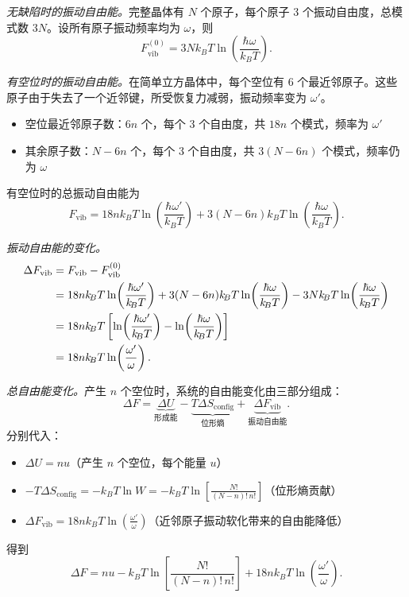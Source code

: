 \begin{derivationbox}[标准解题过程]
\textit{无缺陷时的振动自由能。}完整晶体有 $N$ 个原子，每个原子 3 个振动自由度，总模式数 $3N$。设所有原子振动频率均为 $\omega$，则
\begin{equation}
F_{\mathrm{vib}}^{(0)} = 3N k_{\!B}T\ln\!\left(\frac{\hbar\omega}{k_{\!B}T}\right).
\end{equation}

\textit{有空位时的振动自由能。}在简单立方晶体中，每个空位有 6 个最近邻原子。这些原子由于失去了一个近邻键，所受恢复力减弱，振动频率变为 $\omega'$。
\begin{itemize}
    \item 空位最近邻原子数：$6n$ 个，每个 3 个自由度，共 $18n$ 个模式，频率为 $\omega'$
    \item 其余原子数：$N-6n$ 个，每个 3 个自由度，共 $3(N-6n)$ 个模式，频率仍为 $\omega$
\end{itemize}
有空位时的总振动自由能为
\begin{equation}
F_{\mathrm{vib}} = 18n k_{\!B}T\ln\!\left(\frac{\hbar\omega'}{k_{\!B}T}\right) + 3(N-6n)k_{\!B}T\ln\!\left(\frac{\hbar\omega}{k_{\!B}T}\right).
\end{equation}

\textit{振动自由能的变化。}
\begin{align}
\Delta F_{\mathrm{vib}}
&= F_{\mathrm{vib}} - F_{\mathrm{vib}}^{(0)} \notag\\
&= 18n k_{\!B}T\ln\!\left(\frac{\hbar\omega'}{k_{\!B}T}\right) + 3(N-6n)k_{\!B}T\ln\!\left(\frac{\hbar\omega}{k_{\!B}T}\right) - 3N k_{\!B}T\ln\!\left(\frac{\hbar\omega}{k_{\!B}T}\right) \notag\\
&= 18n k_{\!B}T\left[\ln\!\left(\frac{\hbar\omega'}{k_{\!B}T}\right) - \ln\!\left(\frac{\hbar\omega}{k_{\!B}T}\right)\right] \notag\\
&= 18n k_{\!B}T\ln\!\left(\frac{\omega'}{\omega}\right).
\label{eq:vib-free-energy-change}
\end{align}

\textit{总自由能变化。}产生 $n$ 个空位时，系统的自由能变化由三部分组成：
\begin{equation}
\Delta F = \underbrace{\Delta U}_{\text{形成能}} - \underbrace{T\Delta S_{\mathrm{config}}}_{\text{位形熵}} + \underbrace{\Delta F_{\mathrm{vib}}}_{\text{振动自由能}}.
\end{equation}
分别代入：
\begin{itemize}
    \item $\Delta U = nu$（产生 $n$ 个空位，每个能量 $u$）
    \item $-T\Delta S_{\mathrm{config}} = -k_{\!B}T\ln W = -k_{\!B}T\ln\!\left[\frac{N!}{(N-n)!\,n!}\right]$（位形熵贡献）
    \item $\Delta F_{\mathrm{vib}} = 18n k_{\!B}T\ln\!\left(\frac{\omega'}{\omega}\right)$（近邻原子振动软化带来的自由能降低）
\end{itemize}
得到
\begin{equation}
\Delta F = nu - k_{\!B}T\ln\!\left[\frac{N!}{(N-n)!\,n!}\right] + 18n k_{\!B}T\ln\!\left(\frac{\omega'}{\omega}\right).
\end{equation}


\end{derivationbox}
